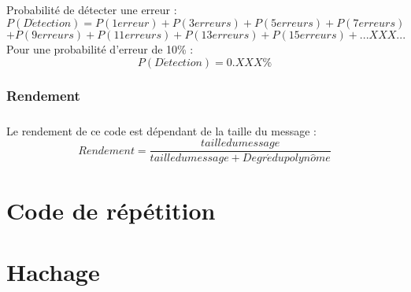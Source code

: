                 \paragraph{}
                    Probabilité de détecter une erreur :
                    \[  P(D\acute{e}tection) = P(1 erreur) + P(3 erreurs) + P(5 erreurs) + P(7 erreurs) \]
                    \[  + P(9 erreurs) + P(11 erreurs) + P(13 erreurs) + P(15 erreurs) + ...XXX... \]
                    Pour une probabilité d'erreur de 10\% :
                    \[  P(D\acute{e}tection) =  0.XXX\% \]

            \subsection{Rendement}

                \paragraph{}
                    Le rendement de ce code est dépendant de la taille du message :
                    \[  Rendement = \frac{taille du message}{taille du message + Degr\acute{e} du polyn\hat{o}me} \]



    \chapter{Code de répétition}



    \chapter{Hachage}


